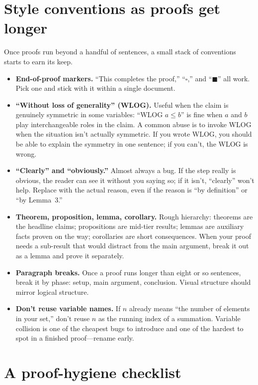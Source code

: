 \documentclass[11pt]{article}
\begin{document}
\section{Style conventions as proofs get longer}

Once proofs run beyond a handful of sentences, a small stack of conventions starts to earn its keep.

\begin{itemize}
  \item \textbf{End-of-proof markers.} ``This completes the proof,'' ``$\square$,'' and ``$\blacksquare$'' all work. Pick one and stick with it within a single document.
  \item \textbf{``Without loss of generality'' (WLOG).} Useful when the claim is genuinely symmetric in some variables: ``WLOG $a \leq b$'' is fine when $a$ and $b$ play interchangeable roles in the claim. A common abuse is to invoke WLOG when the situation isn't actually symmetric. If you wrote WLOG, you should be able to explain the symmetry in one sentence; if you can't, the WLOG is wrong.
  \item \textbf{``Clearly'' and ``obviously.''} Almost always a bug. If the step really is obvious, the reader can see it without you saying so; if it isn't, ``clearly'' won't help. Replace with the actual reason, even if the reason is ``by definition'' or ``by Lemma~3.''
  \item \textbf{Theorem, proposition, lemma, corollary.} Rough hierarchy: theorems are the headline claims; propositions are mid-tier results; lemmas are auxiliary facts proven on the way; corollaries are short consequences. When your proof needs a sub-result that would distract from the main argument, break it out as a lemma and prove it separately.
  \item \textbf{Paragraph breaks.} Once a proof runs longer than eight or so sentences, break it by phase: setup, main argument, conclusion. Visual structure should mirror logical structure.
  \item \textbf{Don't reuse variable names.} If $n$ already means ``the number of elements in your set,'' don't reuse $n$ as the running index of a summation. Variable collision is one of the cheapest bugs to introduce and one of the hardest to spot in a finished proof---rename early.
\end{itemize}

\section{A proof-hygiene checklist}
\end{document}
